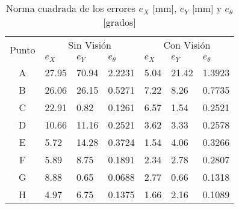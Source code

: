 \begin{table}[t]
\begin{center}

\begin{tabular}{|c||l|l|l||l|l|l|}
\hline
\multirow{2}{*}{Punto} 
      & \multicolumn{3}{c||}{Sin Visión} 
          & \multicolumn{3}{|c|}{Con Visión} \\  \cline{2-7}
          
 & $e_X$ & $e_Y$ & $e_\theta$ & $e_X$ & $e_Y$ & $e_\theta$ \\
\hline
A & 27.95 & 70.94 & 2.2231  &  5.04 & 21.42 & 1.3923	\\
B & 26.06 & 26.15 & 0.5271  &  7.22 &  8.26 & 0.7735	\\
C & 22.91 &  0.82 & 0.1261  &  6.57 &  1.54 & 0.2521	\\
D & 10.66 & 11.16 & 0.2521  &  3.62 &  3.33 & 0.2578	\\
E &  5.72 & 14.28 & 0.3724  &  1.54 &  4.06 & 0.3266	\\
F &  5.89 &  8.75 & 0.1891  &  2.34 &  2.78 & 0.2807	\\
G &  8.88 &  0.65 & 0.0688  &  2.77 &  0.66 & 0.1318	\\
H &  4.97 &  6.75 & 0.1375  &  1.66 &  2.16 & 0.1089	\\
\hline
\end{tabular}
\end{center}
\caption{Norma cuadrada de los errores $e_X$ [mm],  $e_Y$ [mm] y $ e_\theta$ [grados]}
\label{tab:SinVisionConVision}
\end{table}



